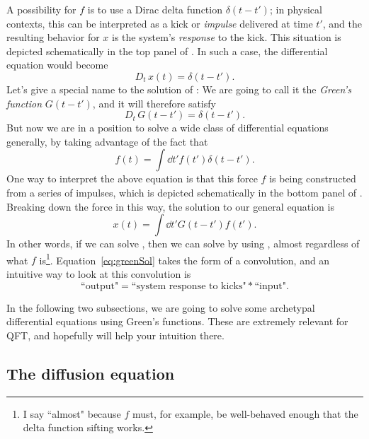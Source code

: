 A possibility for $f$ is to use a Dirac delta function
$\delta(t-t')$; in physical contexts, this can be interpreted as a 
kick or {\it impulse} delivered at time $t'$, and 
the resulting behavior for $x$ is the system's {\it response} 
to the kick. This situation is depicted schematically in the top panel of
. In such a case, the differential equation
 would become
\begin{equation}\label{eq:greenDelta}
  D_t\,x(t)=\delta(t-t').
\end{equation}
Let's give a special name to the solution of : We
are going to call it the {\it Green's function} $G(t-t')$, and it will
therefore satisfy
\begin{equation}\label{eq:greenDeltaSol}
  D_t\,G(t-t')=\delta(t-t').
\end{equation}
But now we are in a position to solve a wide class of differential equations
generally, by taking advantage of the fact that
\begin{equation}\label{eq:deltaSift}
  f(t)=\int\dd{t'}f(t')\delta(t-t').
\end{equation}
One way to interpret the above equation is that this force $f$ is being
constructed from a series of impulses, which is depicted schematically
in the bottom panel of . Breaking down the force
in this way, the solution to our general equation  is
\begin{equation}\label{eq:greenSol}
  x(t)=\int\dd{t'}G(t-t')f(t').
\end{equation}
In other words, if we can solve , then we can
solve  by using , almost
regardless of what $f$ is\footnote{I say ``almost" because $f$ must, for
example, be well-behaved enough that the delta function sifting works.}.
Equation~\eqref{eq:greenSol} takes the form of a convolution, and an
intuitive way to look at this convolution is
\begin{equation}
  \text{``output"} = \text{``system response to kicks"} * \text{``input"}.
\end{equation}

In the following two subsections, we are going to solve some
archetypal differential equations using Green's functions. These are
extremely relevant for QFT, and hopefully will help your intuition there.

\subsection{The diffusion equation}

